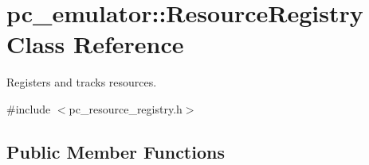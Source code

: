 \hypertarget{classpc__emulator_1_1ResourceRegistry}{}\section{pc\+\_\+emulator\+:\+:Resource\+Registry Class Reference}
\label{classpc__emulator_1_1ResourceRegistry}


Registers and tracks resources.  




{\ttfamily \#include $<$pc\+\_\+resource\+\_\+registry.\+h$>$}

\subsection*{Public Member Functions}
